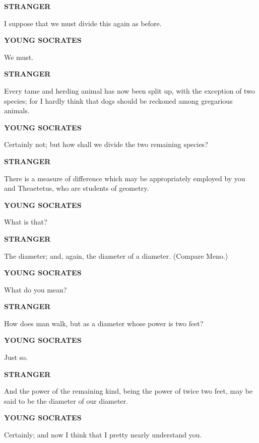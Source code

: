 \documentclass[11pt,letter]{article}
\begin{document}
\par \textbf{STRANGER}
\par   I suppose that we must divide this again as before.

\par \textbf{YOUNG SOCRATES}
\par   We must.

\par \textbf{STRANGER}
\par   Every tame and herding animal has now been split up, with the exception of two species; for I hardly think that dogs should be reckoned among gregarious animals.

\par \textbf{YOUNG SOCRATES}
\par   Certainly not; but how shall we divide the two remaining species?

\par \textbf{STRANGER}
\par   There is a measure of difference which may be appropriately employed by you and Theaetetus, who are students of geometry.

\par \textbf{YOUNG SOCRATES}
\par   What is that?

\par \textbf{STRANGER}
\par   The diameter; and, again, the diameter of a diameter. (Compare Meno.)

\par \textbf{YOUNG SOCRATES}
\par   What do you mean?

\par \textbf{STRANGER}
\par   How does man walk, but as a diameter whose power is two feet?

\par \textbf{YOUNG SOCRATES}
\par   Just so.

\par \textbf{STRANGER}
\par   And the power of the remaining kind, being the power of twice two feet, may be said to be the diameter of our diameter.

\par \textbf{YOUNG SOCRATES}
\par   Certainly; and now I think that I pretty nearly understand you.
\end{document}
